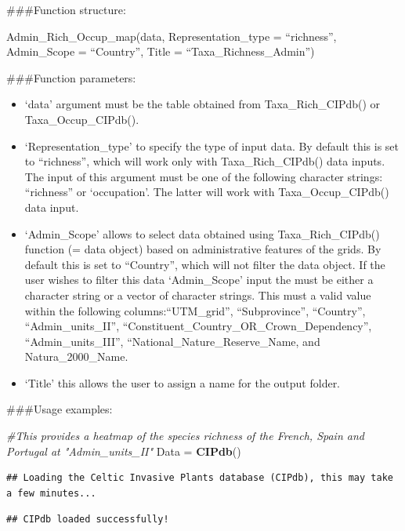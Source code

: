 \documentclass[
]{article}
\newenvironment{Shaded}{\begin{snugshade}}{\end{snugshade}}
\newcommand{\CommentTok}[1]{\textcolor[rgb]{0.56,0.35,0.01}{\textit{#1}}}
\newcommand{\FunctionTok}[1]{\textcolor[rgb]{0.13,0.29,0.53}{\textbf{#1}}}
\newcommand{\NormalTok}[1]{#1}
\newcommand{\OtherTok}[1]{\textcolor[rgb]{0.56,0.35,0.01}{#1}}
\providecommand{\tightlist}{%
  \setlength{\itemsep}{0pt}\setlength{\parskip}{0pt}}
\begin{document}
\#\#\#Function structure:

Admin\_Rich\_Occup\_map(data, Representation\_type = ``richness'',
Admin\_Scope = ``Country'', Title = ``Taxa\_Richness\_Admin'')

\#\#\#Function parameters:

\begin{itemize}
\tightlist
\item
  `data' argument must be the table obtained from Taxa\_Rich\_CIPdb() or
  Taxa\_Occup\_CIPdb().
\item
  `Representation\_type' to specify the type of input data. By default
  this is set to ``richness'', which will work only with
  Taxa\_Rich\_CIPdb() data inputs. The input of this argument must be
  one of the following character strings: ``richness'' or `occupation'.
  The latter will work with Taxa\_Occup\_CIPdb() data input.
\item
  `Admin\_Scope' allows to select data obtained using
  Taxa\_Rich\_CIPdb() function (= data object) based on administrative
  features of the grids. By default this is set to ``Country'', which
  will not filter the data object. If the user wishes to filter this
  data `Admin\_Scope' input the must be either a character string or a
  vector of character strings. This must a valid value within the
  following columns:``UTM\_grid'', ``Subprovince'', ``Country'',
  ``Admin\_units\_II'', ``Constituent\_Country\_OR\_Crown\_Dependency'',
  ``Admin\_units\_III'', ``National\_Nature\_Reserve\_Name, and
  Natura\_2000\_Name.
\item
  `Title' this allows the user to assign a name for the output folder.
\end{itemize}

\#\#\#Usage examples:

\begin{Shaded}
\begin{Highlighting}[]
\CommentTok{\#This provides a heatmap of the species richness of the French, Spain and Portugal at "Admin\_units\_II"}
\NormalTok{Data }\OtherTok{=} \FunctionTok{CIPdb}\NormalTok{()}
\end{Highlighting}
\end{Shaded}

\begin{verbatim}
## Loading the Celtic Invasive Plants database (CIPdb), this may take a few minutes...
\end{verbatim}

\begin{verbatim}
## CIPdb loaded successfully!
\end{verbatim}
\end{document}
